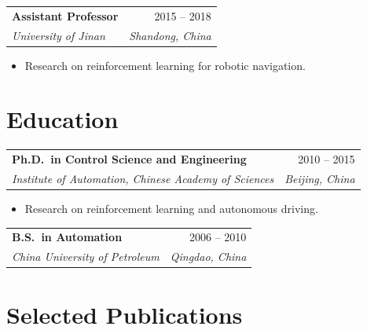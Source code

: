 \documentclass[10pt, a4paper]{article}
\makeatletter
\newcommand{\cventry}[4]{%
  \begin{tabular*}{\linewidth}{@{}l@{\extracolsep{\fill}}r@{}}
    \textbf{#1} & {#4} \\[-0.1em]
    \textit{\small #2} & \textit{\small #3}
  \end{tabular*}%
  \vspace{0.1em}%
}
\makeatother
\begin{document}
\vspace{0.35em}
\cventry{Assistant Professor}{University of Jinan}{Shandong, China}{2015 -- 2018}
\begin{itemize}[leftmargin=1.5em, itemsep=0.1em, topsep=0.15em, parsep=0pt, label=\textbullet]
  \item {\small Research on reinforcement learning for robotic navigation.}
\end{itemize}

\section{Education}

\cventry{Ph.D.\ in Control Science and Engineering}%
        {Institute of Automation, Chinese Academy of Sciences}%
        {Beijing, China}{2010 -- 2015}
\begin{itemize}[leftmargin=1.5em, itemsep=0.1em, topsep=0.15em, parsep=0pt, label=\textbullet]
  \item {\small Research on reinforcement learning and autonomous driving.}
\end{itemize}

\vspace{0.35em}
\cventry{B.S.\ in Automation}{China University of Petroleum}{Qingdao, China}{2006 -- 2010}

\section{Selected Publications}
\end{document}
